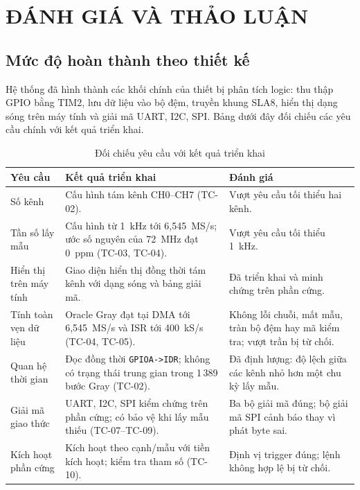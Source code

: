 \chapter{ĐÁNH GIÁ VÀ THẢO LUẬN}\label{ux111uxe1nh-giuxe1-vuxe0-thux1ea3o-luux1eadn}

\section{Mức độ hoàn thành theo thiết kế}\label{mux1ee9c-ux111ux1ed9-houxe0n-thuxe0nh-theo-thiux1ebft-kux1ebf}

Hệ thống đã hình thành các khối chính của thiết bị phân tích logic: thu thập GPIO bằng TIM2, lưu dữ liệu vào bộ đệm, truyền khung SLA8, hiển thị dạng sóng trên máy tính và giải mã UART, I2C, SPI. Bảng dưới đây đối chiếu các yêu cầu chính với kết quả triển khai.

\begin{longtable}[]{@{}|
  >{\raggedright\arraybackslash}p{}
  |>{\raggedright\arraybackslash}p{}
  |>{\raggedright\arraybackslash}p{}|@{}}
\caption{Đối chiếu yêu cầu với kết quả triển khai}\tabularnewline
\hline
\textbf{Yêu cầu} & \textbf{Kết quả triển khai} & \textbf{Đánh giá} \\ \hline

Số kênh & Cấu hình tám kênh CH0--CH7 (TC-02). & Vượt yêu cầu tối thiểu hai kênh. \\ \hline
Tần số lấy mẫu & Cấu hình từ 1~kHz tới 6,545~MS/s; ước số nguyên của 72~MHz đạt 0~ppm (TC-03, TC-04). & Vượt yêu cầu tối thiểu 1~kHz. \\ \hline
Hiển thị trên máy tính & Giao diện hiển thị đồng thời tám kênh với dạng sóng và bảng giải mã. & Đã triển khai và minh chứng trên phần cứng. \\ \hline
Tính toàn vẹn dữ liệu & Oracle Gray đạt tại DMA tới 6,545~MS/s và ISR tới 400~kS/s (TC-04, TC-05). & Không lỗi chuỗi, mất mẫu, tràn bộ đệm hay mã kiểm tra; vượt trần bị từ chối. \\ \hline
Quan hệ thời gian & Đọc đồng thời \texttt{GPIOA->IDR}; không có trạng thái trung gian trong 1\,389 bước Gray (TC-02). & Đã định lượng: độ lệch giữa các kênh nhỏ hơn một chu kỳ lấy mẫu. \\ \hline
Giải mã giao thức & UART, I2C, SPI kiểm chứng trên phần cứng; có bảo vệ khi lấy mẫu thiếu (TC-07--TC-09). & Ba bộ giải mã đúng; bộ giải mã SPI cảnh báo thay vì phát byte sai. \\ \hline
Kích hoạt phần cứng & Kích hoạt theo cạnh/mẫu với tiền kích hoạt; kiểm tra tham số (TC-10). & Định vị trigger đúng; lệnh không hợp lệ bị từ chối. \\ \hline

\end{longtable}

